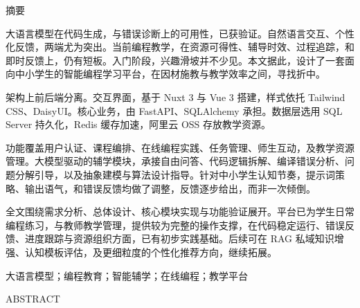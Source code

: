 \cleardoublepage
\vspace*{2\baselineskip}
{\HduLevelOneTitleFormat 摘要\par}
\vspace{2\baselineskip}

{\song{}\setlength{\baselineskip}{20pt}
大语言模型在代码生成，与错误诊断上的可用性，已获验证。自然语言交互、个性化反馈，两端尤为突出。当前编程教学，在资源可得性、辅导时效、过程追踪，和即时反馈上，仍有短板。入门阶段，兴趣滑坡并不少见。本文据此，设计了一套面向中小学生的智能编程学习平台，在因材施教与教学效率之间，寻找折中。

架构上前后端分离。交互界面，基于 Nuxt 3 与 Vue 3 搭建，样式依托 Tailwind CSS、DaisyUI。核心业务，由 FastAPI、SQLAlchemy 承担。数据层选用 SQL Server 持久化，Redis 缓存加速，阿里云 OSS 存放教学资源。

功能覆盖用户认证、课程编排、在线编程实践、任务管理、师生互动，及教学资源管理。大模型驱动的辅学模块，承接自由问答、代码逻辑拆解、编译错误分析、问题分解引导，以及抽象建模与算法设计指导。针对中小学生认知节奏，提示词策略、输出语气，和错误反馈均做了调整，反馈逐步给出，而非一次倾倒。

全文围绕需求分析、总体设计、核心模块实现与功能验证展开。平台已为学生日常编程练习，与教师教学管理，提供较为完整的操作支撑，在代码稳定运行、错误反馈、进度跟踪与资源组织方面，已有初步实践基础。后续可在 RAG 私域知识增强、认知模板评估，及更细粒度的个性化推荐方向，继续拓展。

\vspace{20pt}
\song{}大语言模型；编程教育；智能辅学；在线编程；教学平台
}

\cleardoublepage
\vspace*{2\baselineskip}
{\HduLevelOneTitleFormat ABSTRACT\par}
\vspace{2\baselineskip}

